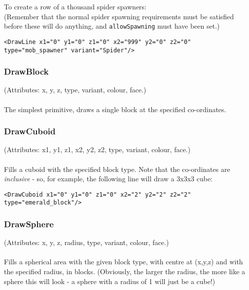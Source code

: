 \documentclass[11pt]{article} %
\begin{document}
To create a row of a thousand spider spawners:\\
(Remember that the normal spider spawning requirements must be satisfied before these will do anything, and \lstinline!allowSpawning! must have been set.)
\begin{lstlisting}[frame=lines]
<DrawLine x1="0" y1="0" z1="0" x2="999" y2="0" z2="0" type="mob_spawner" variant="Spider"/>
\end{lstlisting}

\subsubsection{DrawBlock}
(Attributes: x, y, z, type, variant, colour, face.)\\
\\
The simplest primitive, draws a single block at the specified co-ordinates.

\subsubsection{DrawCuboid}
(Attributes: x1, y1, z1, x2, y2, z2, type, variant, colour, face.)\\
\\
Fills a cuboid with the specified block type. Note that the co-ordinates are \emph{inclusive} - so, for example, the following line will draw a 3x3x3 cube:\\

\begin{lstlisting}[frame=lines]
<DrawCuboid x1="0" y1="0" z1="0" x2="2" y2="2" z2="2" type="emerald_block"/>
\end{lstlisting}

\subsubsection{DrawSphere}
(Attributes: x, y, z, radius, type, variant, colour, face.)\\
\\
Fills a spherical area with the given block type, with centre at (x,y,z) and with the specified radius, in blocks.
(Obviously, the larger the radius, the more like a sphere this will look - a sphere with a radius of 1 will just be a cube!)
\end{document}
